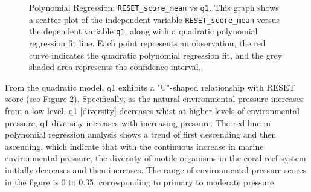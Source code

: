 \documentclass[a4paper, 11]{article}
\begin{document}
\begin{figure}[H]
    \centering
    \caption{Polynomial Regression: \texttt{RESET\_score\_mean} vs \texttt{q1}. This graph shows a scatter plot of the independent variable \texttt{RESET\_score\_mean} versus the dependent variable \texttt{q1}, along with a quadratic polynomial regression fit line. Each point represents an observation, the red curve indicates the quadratic polynomial regression fit, and the grey shaded area represents the confidence interval.}
\end{figure}

From the quadratic model, q1 exhibits a "U"-shaped relationship with RESET score (see Figure 2). Specifically, as the natural environmental pressure increases from a low level, q1 [diversity] decreases whist at higher levels of environmental pressure, q1 diversity increases with increasing pressure. The red line in polynomial regression analysis shows a trend of first descending and then ascending, which indicate that with the continuous increase in marine environmental pressure, the diversity of motile organisms in the coral reef system initially decreases and then increases. The range of environmental pressure scores in the figure is 0 to 0.35, corresponding to primary to moderate pressure.
\end{document}
